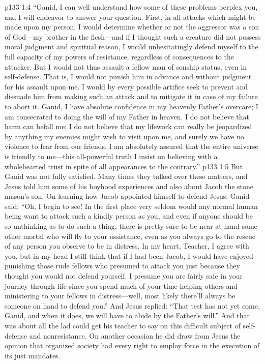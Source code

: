 \vs p133 1:4 \textcolor{ubdarkred}{“Ganid, I can well understand how some of these problems perplex you, and I will endeavor to answer your question. First, in all attacks which might be made upon my person, I would determine whether or not the aggressor was a son of God---my brother in the flesh---and if I thought such a creature did not possess moral judgment and spiritual reason, I would unhesitatingly defend myself to the full capacity of my powers of resistance, regardless of consequences to the attacker. But I would not thus assault a fellow man of sonship status, even in self\hyp{}defense. That is, I would not punish him in advance and without judgment for his assault upon me. I would by every possible artifice seek to prevent and dissuade him from making such an attack and to mitigate it in case of my failure to abort it. Ganid, I have absolute confidence in my heavenly Father’s overcare; I am consecrated to doing the will of my Father in heaven. I do not believe that  harm can befall me; I do not believe that my lifework can really be jeopardized by anything my enemies might wish to visit upon me, and surely we have no violence to fear from our friends. I am absolutely assured that the entire universe is friendly to me---this all\hyp{}powerful truth I insist on believing with a wholehearted trust in spite of all appearances to the contrary.”}
\vs p133 1:5 But Ganid was not fully satisfied. Many times they talked over these matters, and Jesus told him some of his boyhood experiences and also about Jacob the stone mason’s son. On learning how Jacob appointed himself to defend Jesus, Ganid said: “Oh, I begin to see! In the first place very seldom would any normal human being want to attack such a kindly person as you, and even if anyone should be so unthinking as to do such a thing, there is pretty sure to be near at hand some other mortal who will fly to your assistance, even as you always go to the rescue of any person you observe to be in distress. In my heart, Teacher, I agree with you, but in my head I still think that if I had been Jacob, I would have enjoyed punishing those rude fellows who presumed to attack you just because they thought you would not defend yourself. I presume you are fairly safe in your journey through life since you spend much of your time helping others and ministering to your fellows in distress---well, most likely there’ll always be someone on hand to defend you.” And Jesus replied: \textcolor{ubdarkred}{“That test has not yet come, Ganid, and when it does, we will have to abide by the Father’s will.”} And that was about all the lad could get his teacher to say on this difficult subject of self\hyp{}defense and nonresistance. On another occasion he did draw from Jesus the opinion that organized society had every right to employ force in the execution of its just mandates.
